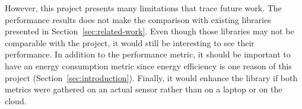 \documentclass{article}
\begin{document}
However, this project presents many limitations that trace future work.
The performance results does not make the comparison with existing libraries presented in Section~\ref{sec:related-work}. Even though those libraries may not be comparable with the project, it would still be interesting to see their performance.
In addition to the performance metric, it should be important to have an energy consumption metric since energy efficiency is one reason of this project (Section~\ref{sec:introduction}).
Finally, it would enhance the library if both metrics were gathered on an actual sensor rather than on a laptop or on the cloud.



\end{document}
